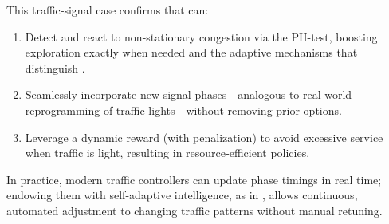 This traffic‐signal case confirms that \adaptiverl can:
\begin{enumerate}
  \item Detect and react to non-stationary congestion via the PH-test, boosting exploration exactly when needed and the adaptive mechanisms that distinguish \adaptiverl.
  \item Seamlessly incorporate new signal phases—analogous to real‐world reprogramming of traffic lights—without removing prior options.
  \item Leverage a dynamic reward (with penalization) to avoid excessive service when traffic is light, resulting in resource‐efficient policies.
\end{enumerate}
In practice, modern traffic controllers can update phase timings in real time; endowing them with self-adaptive intelligence, as in \adaptiverl, allows continuous, automated adjustment to changing traffic patterns without manual retuning.

\endinput

